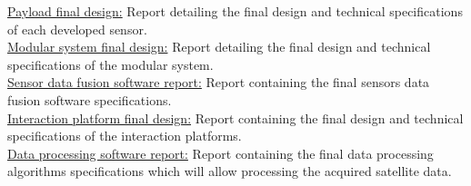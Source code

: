 \begin{longtable}
{{		 \underline{Payload final design:} Report detailing the final design and technical specifications of
each developed sensor.\\

		 \underline{Modular system final design:} Report detailing the final design and technical specifications of
the modular system.\\

		 \underline{Sensor data fusion software report:} Report containing the final sensors data fusion software
specifications.\\

		 \underline{Interaction platform final design:} Report containing the final design and technical specifications
of the interaction platforms.\\

		 \underline{Data processing software report:} Report containing the final data processing algorithms
specifications which will allow processing the acquired satellite
data.\\

		 
		 
		 }}\\
		 
		 \hline 
		 
		
		\caption{WP4 description}
		
\end{longtable}


